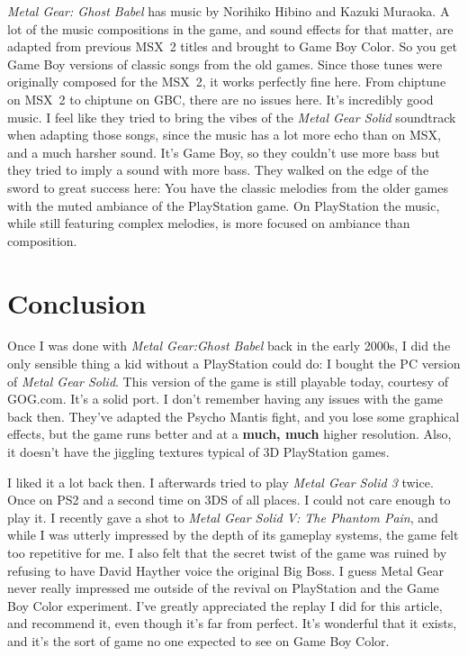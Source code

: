 \documentclass{book}
\begin{document}
\emph{Metal Gear: Ghost Babel} has music by Norihiko Hibino and Kazuki Muraoka. A lot of the music compositions in the game, and sound effects for that matter, are adapted from previous MSX~2 titles and brought to Game Boy Color. So you get Game Boy versions of classic songs from the old games. Since those tunes were originally composed for the MSX~2, it works perfectly fine here. From chiptune on MSX~2 to chiptune on GBC, there are no issues here. It’s incredibly good music. I feel like they tried to bring the vibes of the \emph{Metal Gear Solid} soundtrack when adapting those songs, since the music has a lot more echo than on MSX, and a much harsher sound. It’s Game Boy, so they couldn’t use more bass but they tried to imply a sound with more bass. They walked on the edge of the sword to great success here: You have the classic melodies from the older games with the muted ambiance of the PlayStation game. On PlayStation the music, while still featuring complex melodies, is more focused on ambiance than composition.

\FloatBarrier\needspace{10mm}\section*{Conclusion}\nopagebreak[4]

Once I was done with \emph{Metal Gear:Ghost Babel} back in the early 2000s, I did the only sensible thing a kid without a PlayStation could do: I bought the PC version of \emph{Metal Gear Solid}. This version of the game is still playable today, courtesy of GOG.com. It’s a solid port. I don’t remember having any issues with the game back then. They’ve adapted the Psycho Mantis fight, and you lose some graphical effects, but the game runs better and at a \textbf{much, much} higher resolution. Also, it doesn’t have the jiggling textures typical of 3D PlayStation games.

I liked it a lot back then. I afterwards tried to play \emph{Metal Gear Solid 3} twice. Once on PS2 and a second time on 3DS of all places. I could not care enough to play it. I recently gave a shot to \emph{Metal Gear Solid V: The Phantom Pain}, and while I was utterly impressed by the depth of its gameplay systems, the game felt too repetitive for me. I also felt that the secret twist of the game was ruined by refusing to have David Hayther voice the original Big Boss. I guess Metal Gear never really impressed me outside of the revival on PlayStation and the Game Boy Color experiment. I’ve greatly appreciated the replay I did for this article, and recommend it, even though it’s far from perfect. It’s wonderful that it exists, and it’s the sort of game no one expected to see on Game Boy Color.
\end{document}

